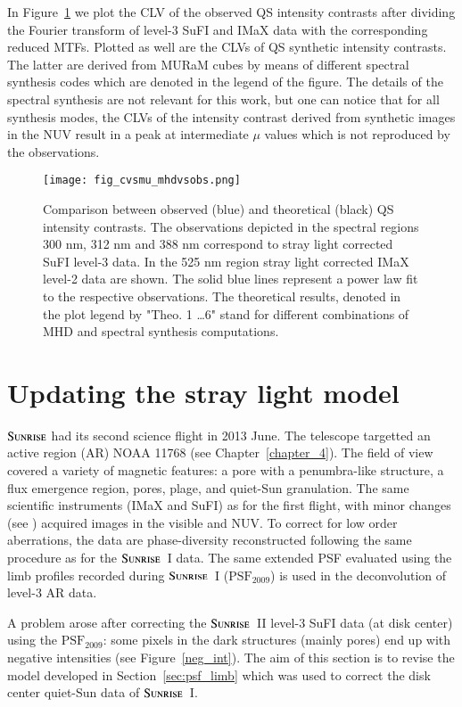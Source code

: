 \documentclass[goettingen, gauss, print]{thesis}
\begin{document}
In Figure~\ref{fig:cvsmu_mhd} we plot the CLV of the observed QS intensity contrasts after dividing the Fourier transform of level-3 SuFI and IMaX data with the corresponding reduced MTFs. Plotted as well are the CLVs of QS synthetic intensity contrasts. The latter are derived from MURaM cubes by means of different spectral synthesis codes which are denoted in the legend of the figure. The details of the spectral synthesis are not relevant for this work, but one can notice that for all synthesis modes, the CLVs of the intensity contrast derived from synthetic images in the NUV result in a peak at intermediate $\mu$ values which is not reproduced by the observations.   

\begin{figure}
\texttt{[image: fig\_cvsmu\_mhdvsobs.png]}
\caption{Comparison between observed (blue) and theoretical (black) QS intensity contrasts. The observations depicted in the spectral regions 300 nm, 312 nm and 388 nm correspond to stray light corrected SuFI level-3 data. In the 525 nm region stray light corrected IMaX level-2 data are shown. The solid blue lines represent a power law fit to the respective observations. The theoretical results, denoted in the plot legend by "Theo. 1 \ldots 6" stand for different combinations of MHD and spectral synthesis computations.}
\label{fig:cvsmu_mhd}

\end{figure}

\section{Updating the stray light model}
\label{SL_up}


$\textsc{Sunrise}$ had its second science flight in 2013 June. The telescope targetted an active region (AR) NOAA 11768 (see Chapter~\ref{chapter_4}). The field of view covered a variety of magnetic features: a pore with a penumbra-like structure, a flux emergence region, pores, plage, and quiet-Sun granulation. The same scientific instruments (IMaX and SuFI) as for the first flight, with minor changes (see \cite{solanki_second_2017}) acquired images in the visible and NUV. To correct for low order aberrations, the data are phase-diversity reconstructed following the same procedure as for the $\textsc{Sunrise}$~I data. The same extended PSF evaluated using the limb profiles recorded during $\textsc{Sunrise}$~I ($\mathrm{PSF}_{\mathrm{2009}}$) is used in the deconvolution of level-3 AR data.

A problem arose after correcting the $\textsc{Sunrise}$~II level-3 SuFI data (at disk center) using the $\mathrm{PSF}_{\mathrm{2009}}$: some pixels in the dark structures (mainly pores) end up with negative intensities (see Figure~\ref{neg_int}). The aim of this section is to revise the model developed in Section~\ref{sec:psf_limb} which was used to correct the disk center quiet-Sun data of $\textsc{Sunrise}$~I. 
\end{document}
